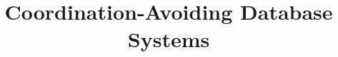 \documentclass{sig-alternate}
\theoremstyle{definition}
\theoremstyle{remark}
\begin{document}
%

\title{Coordination-Avoiding Database Systems}

\maketitle






















\scriptsize
 
\end{document}
